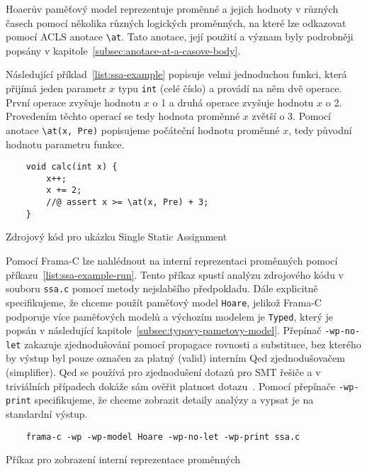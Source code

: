 Hoaerův paměťový model reprezentuje proměnné a jejich hodnoty v různých časech
pomocí několika různých logických proměnných, na které lze odkazovat pomocí
ACLS anotace \texttt{\textbackslash at}.
Tato anotace, její použití a význam byly podrobněji popsány v kapitole~\ref{subsec:anotace-at-a-casove-body}.

Následující příklad~\ref{list:ssa-example} popisuje velmi jednoduchou funkci,
která přijímá jeden parametr $x$ typu \texttt{int} (celé číslo) a provádí na něm dvě operace.
První operace zvyšuje hodnotu $x$ o 1 a druhá operace zvyšuje hodnotu $x$ o 2.
Provedením těchto operací se tedy hodnota proměnné $x$ zvětší o 3.
Pomocí anotace \texttt{\textbackslash at(x, Pre)} popisujeme počáteční hodnotu proměnné $x$,
tedy původní hodnotu parametru funkce.

\begin{listing}[H]
    \begin{verbatim}
    void calc(int x) {
        x++;
        x += 2;
        //@ assert x >= \at(x, Pre) + 3;
    }
    \end{verbatim}
    \caption{Zdrojový kód pro ukázku Single Static Assignment}
    \label{list:ssa-example}
\end{listing}

Pomocí Frama\mbox{-}C lze nahlédnout na interní reprezentaci proměnných pomocí příkazu~\ref{list:ssa-example-run}.
Tento příkaz spustí analýzu zdrojového kódu v souboru \texttt{ssa.c} pomocí metody nejslabšího předpokladu.
Dále explicitně specifikujeme, že chceme použít paměťový model \texttt{Hoare},
jelikož Frama\mbox{-}C podporuje více paměťových modelů a výchozím modelem je \texttt{Typed},
který je popsán v následující kapitole~\ref{subsec:typovy-pametovy-model}.
Přepínač \texttt{-wp-no-let} zakazuje zjednodušování pomocí propagace rovnosti a substituce,
bez kterého by výstup byl pouze označen za platný (valid) interním Qed zjednodušovačem (simplifier).
Qed se používá pro zjednodušení dotazů pro SMT řešiče a v triviálních případech dokáže sám ověřit platnost dotazu~\cite{WPManual, BlanchardWP2024}.
Pomocí přepínače \texttt{-wp-print} specifikujeme, že chceme zobrazit detaily analýzy a vypsat je na standardní výstup.

\begin{listing}[H]
    \begin{verbatim}
    frama-c -wp -wp-model Hoare -wp-no-let -wp-print ssa.c
    \end{verbatim}
    \caption{Příkaz pro zobrazení interní reprezentace proměnných}
    \label{list:ssa-example-run}
\end{listing}


